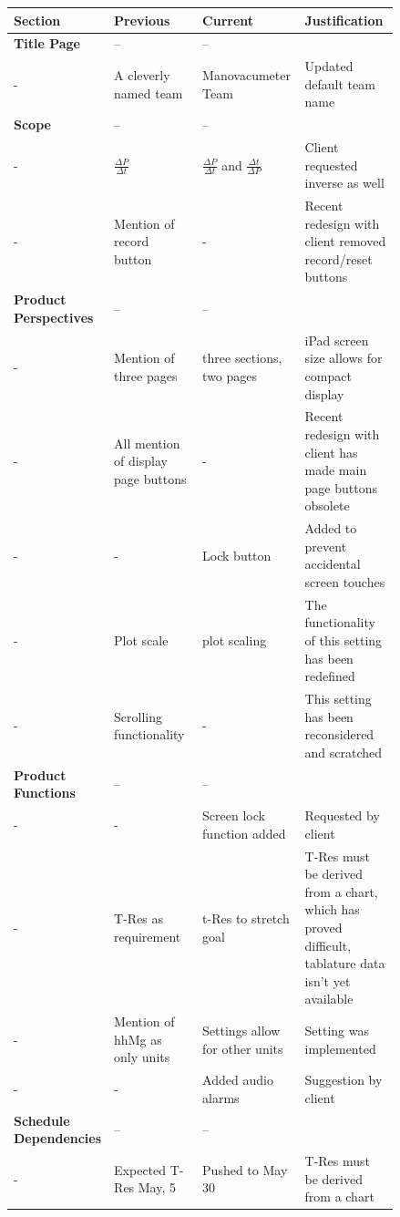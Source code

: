 \documentclass[onecolumn, draftclsnofoot,10pt, compsoc]{IEEEtran}
\begin{document}
\begin{center}
	\begin{longtable}{| l | p{0.28\linewidth} | p{0.28\linewidth} | p{0.28\linewidth} |}
		\hline Section & Previous & Current & Justification \\ \hline \hline
		\textbf{Title Page} & -- & -- \\ \hline
		- & A cleverly named team & Manovacumeter Team & Updated default team name \\ \hline
		\textbf{Scope} & -- & -- \\ \hline
		- & $\frac{\Delta P}{\Delta t}$ & $\frac{\Delta P}{\Delta t}$ and $\frac{\Delta t}{\Delta P}$ & Client requested inverse as well \\ \hline
		- & Mention of record button & - & Recent redesign with client removed record/reset buttons \\ \hline \hline
 		\textbf{Product Perspectives} & -- & -- \\ \hline
		- & Mention of three pages & three sections, two pages & iPad screen size allows for compact display  \\ \hline
		- & All mention of display page buttons & - & Recent redesign with client has made main page buttons obsolete \\ \hline
		- & - & Lock button & Added to prevent accidental screen touches \\ \hline
		- & Plot scale & plot scaling & The functionality of this setting has been redefined \\ \hline
		- & Scrolling functionality & - & This setting has been reconsidered and scratched \\ \hline \hline
 		\textbf{Product Functions} & -- & -- \\ \hline
		- & - & Screen lock function added & Requested by client \\ \hline
		- & T-Res as requirement & t-Res to stretch goal & T-Res must be derived from a chart, which has proved difficult, tablature data isn't yet available \\ \hline
		- & Mention of hhMg as only units & Settings allow for other units & Setting was implemented \\ \hline
		- & - & Added audio alarms & Suggestion by client \\ \hline \hline
		\textbf{Schedule Dependencies} & -- & -- \\ \hline
		- & Expected T-Res May, 5 & Pushed to May 30 & T-Res must be derived from a chart \\ \hline \hline

\end{longtable}
\end{center}
\end{document}
